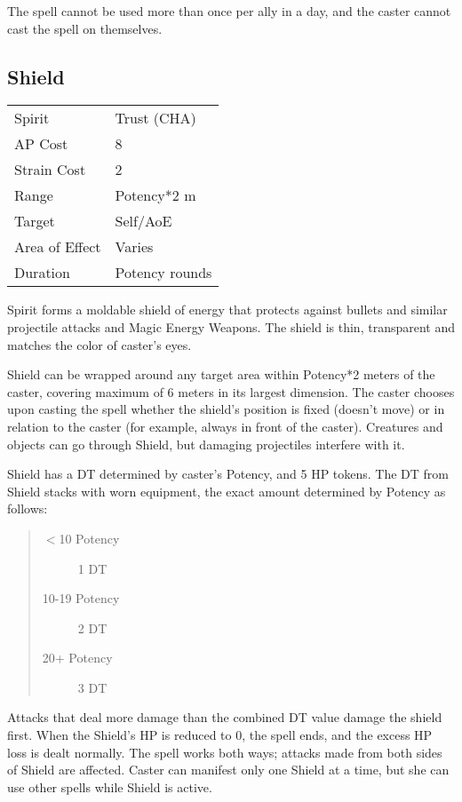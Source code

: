 \documentclass[11pt,a4paper,twocolumn]{book}
\begin{document}
The spell cannot be used more than once per ally in a day, and the caster cannot cast the spell on themselves.



\subsection*{Shield}
{
	\begin{tabu} to 75mm{| X[l,4] | X[l,7] |}
		\hline
		Spirit 			& Trust (CHA) 		\\
		AP Cost	      	& 8 						\\
		Strain Cost     & 2 						\\
		Range     		& Potency*2	m				\\
		Target      	& Self/AoE					\\
		Area of Effect  & Varies  	 				\\
		Duration     	& Potency rounds			\\ \hline
	\end{tabu}
	
}

\medskip

Spirit forms a moldable shield of energy that protects against bullets and similar projectile attacks and Magic Energy Weapons. The shield is thin, transparent and matches the color of caster's eyes.

Shield can be wrapped around any target area within Potency*2 meters of the caster, covering maximum of 6 meters in its largest dimension. The caster chooses upon casting the spell whether the shield's position is fixed (doesn't move) or in relation to the caster (for example, always in front of the caster). Creatures and objects can go through Shield, but damaging projectiles interfere with it.


\newpage
Shield has a DT determined by caster's Potency, and 5 HP tokens. The DT from Shield stacks with worn equipment, the exact amount determined by Potency as follows:
\begin{quote}
	\begin{description}
		\item[$<$10 Potency] 	1 DT
		\item[10-19 Potency]    2 DT
		\item[20+ Potency] 		3 DT
	\end{description}
\end{quote}

Attacks that deal more damage than the combined DT value damage the shield first. When the Shield's HP is reduced to 0, the spell ends, and the excess HP loss is dealt normally. The spell works both ways; attacks made from both sides of Shield are affected. Caster can manifest only one Shield at a time, but she can use other spells while Shield is active.
\end{document}
